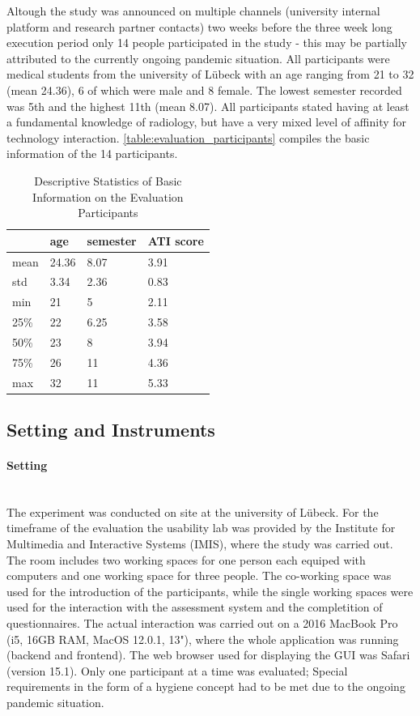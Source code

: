 \documentclass[11pt,a4paper,english]{scrreprt}
\begin{document}
Altough the study was announced on multiple channels (university internal platform and research partner contacts) two weeks before the three week long execution period only 14 people participated in the study - this may be partially attributed to the currently ongoing pandemic situation. All participants were medical students from the university of Lübeck with an age ranging from 21 to 32 (mean 24.36), 6 of which were male and 8 female. The lowest semester recorded was 5th and the highest 11th (mean 8.07). All participants stated having at least a fundamental knowledge of radiology, but have a very mixed level of affinity for technology interaction. \autoref{table:evaluation_participants} compiles the basic information of the 14 participants.

\begin{table}[htbp]
    \centering
    \begin{tabularx}{0.45\textwidth}{ l | l l X }
        \toprule
        & age & semester & ATI score \\
        \midrule
        mean & 24.36 & 8.07 & 3.91 \\
        std & 3.34 & 2.36 & 0.83 \\
        min & 21 & 5 & 2.11 \\
        25\% & 22 & 6.25 & 3.58 \\
        50\% & 23 & 8 & 3.94 \\
        75\% & 26 & 11 & 4.36 \\
        max & 32 & 11 & 5.33 \\
        \bottomrule
    \end{tabularx}
    \caption{Descriptive Statistics of Basic Information on the Evaluation Participants}
    \label{table:evaluation_participants}
\end{table}

\subsection{Setting and Instruments}
\paragraph{Setting}\mbox{} \\
The experiment was conducted on site at the university of Lübeck. For the timeframe of the evaluation the usability lab was provided by the Institute for Multimedia and Interactive Systems (IMIS), where the study was carried out. The room includes two working spaces for one person each equiped with computers and one working space for three people. The co-working space was used for the introduction of the participants, while the single working spaces were used for the interaction with the assessment system and the completition of questionnaires. The actual interaction was carried out on a 2016 MacBook Pro (i5, 16GB RAM, MacOS 12.0.1, 13"), where the whole application was running (backend and frontend). The web browser used for displaying the GUI was Safari (version 15.1). Only one participant at a time was evaluated; Special requirements in the form of a hygiene concept had to be met due to the ongoing pandemic situation.
\end{document}
